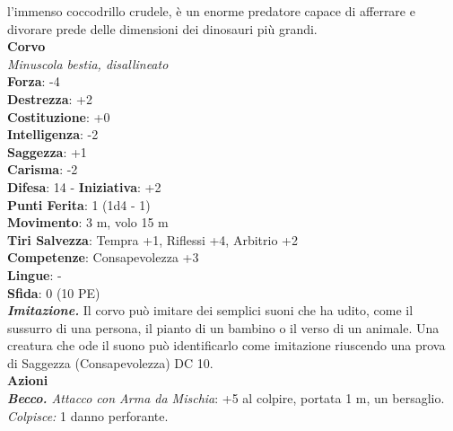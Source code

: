 \begin{multicols}{2}
l'immenso coccodrillo crudele, è un enorme predatore capace di afferrare e divorare prede delle dimensioni dei dinosauri più grandi. \\


\medskip\textbf{Corvo}\\
\emph{Minuscola bestia, disallineato}\\
\textbf{Forza}: -4\\
\textbf{Destrezza}: +2\\
\textbf{Costituzione}: +0\\
\textbf{Intelligenza}: -2\\
\textbf{Saggezza}: +1\\
\textbf{Carisma}: -2\\
\textbf{Difesa}: 14 - \textbf{Iniziativa}: +2\\
\textbf{Punti Ferita}: 1 (1d4 - 1)\\
\textbf{Movimento}: 3 m, volo 15 m\\
\textbf{Tiri Salvezza}: Tempra +1, Riflessi +4, Arbitrio +2 \\
\textbf{Competenze}: Consapevolezza +3\\
\textbf{Lingue}: -\\
\textbf{Sfida}: 0 (10 PE)\smallskip\\
\emph{\textbf{Imitazione.}} Il corvo può imitare dei semplici suoni che ha udito, come il sussurro di una persona, il pianto di un bambino o il verso di un animale. Una creatura che ode il suono può identificarlo come imitazione riuscendo una prova di Saggezza (Consapevolezza) DC 10.\\
\smallskip\textbf{Azioni}\\
\emph{\textbf{Becco.} Attacco con Arma da Mischia}: +5 al colpire, portata 1 m, un bersaglio.\\
\emph{Colpisce:} 1 danno perforante.\\



\end{multicols}
